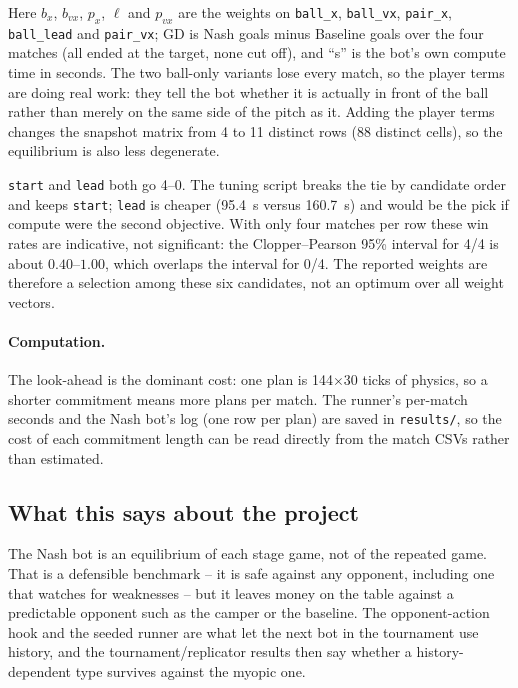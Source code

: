 \noindent Here $b_x$, $b_{vx}$, $p_x$, $\ell$ and $p_{vx}$ are the weights on
\texttt{ball\_x}, \texttt{ball\_vx}, \texttt{pair\_x}, \texttt{ball\_lead} and
\texttt{pair\_vx}; GD is Nash goals minus Baseline goals over the four matches
(all ended at the target, none cut off), and ``s'' is the bot's own compute
time in seconds. The two ball-only variants lose every match, so the player
terms are doing real work: they tell the bot whether it is actually in front
of the ball rather than merely on the same side of the pitch as it. Adding the
player terms changes the snapshot matrix from 4 to 11 distinct rows (88
distinct cells), so the equilibrium is also less degenerate.

\noindent \texttt{start} and \texttt{lead} both go 4--0. The tuning script breaks
the tie by candidate order and keeps \texttt{start}; \texttt{lead} is cheaper
(95.4~s versus 160.7~s) and would be the pick if compute were the second
objective. With only four matches per row these win rates are indicative, not
significant: the Clopper--Pearson 95\% interval for 4/4 is about
$0.40$--$1.00$, which overlaps the interval for 0/4. The reported weights are
therefore a selection among these six candidates, not an optimum over all
weight vectors.

\paragraph{Computation.}
The look-ahead is the dominant cost: one plan is 144$\times$30 ticks of
physics, so a shorter commitment means more plans per match. The runner's
per-match seconds and the Nash bot's log (one row per plan) are saved in
\texttt{results/}, so the cost of each commitment length can be read directly
from the match CSVs rather than estimated.

\subsection{What this says about the project}

The Nash bot is an equilibrium of each stage game, not of the repeated game.
That is a defensible benchmark -- it is safe against any opponent, including
one that watches for weaknesses -- but it leaves money on the table against a
predictable opponent such as the camper or the baseline. The opponent-action
hook and the seeded runner are what let the next bot in the tournament use
history, and the tournament/replicator results then say whether a
history-dependent type survives against the myopic one.
